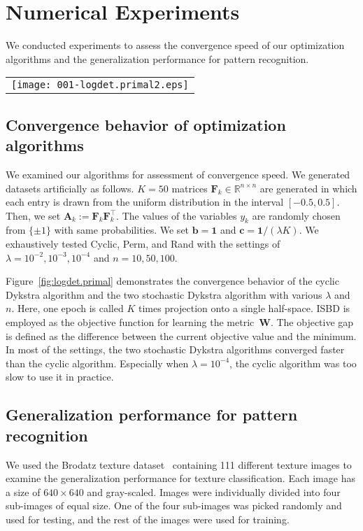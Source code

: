 \documentclass[10pt,onecolumn]{article}
\theoremstyle{definition}
\theoremstyle{definition}
\theoremstyle{definition}
\theoremstyle{definition}
\theoremstyle{definition}
\theoremstyle{theorem}
\newcommand{\0}{{\bm{0}}}
\newcommand{\1}{{\bm{1}}}
\newcommand{\vb}{{\bm{b}}}
\newcommand{\vc}{{\bm{c}}}
\newcommand{\vA}{{\bm{A}}}
\newcommand{\vF}{{\bm{F}}}
\newcommand{\bR}{{\mathbb{R}}}
\newcommand{\vW}{{\bm{W}}}
\begin{document}
\section{Numerical Experiments}

We conducted experiments to assess the convergence speed of
our optimization algorithms and the generalization
performance for pattern recognition.

\begin{figure*}[t!]
\begin{center}
\begin{tabular}{l}
\texttt{[image: 001-logdet.primal2.eps]}
\end{tabular}
\end{center}
\caption{Convergence behavior of the algorithms using different settings. \label{fig:logdet.primal}}
\end{figure*}

\subsection{Convergence behavior of optimization algorithms}
We examined our algorithms for assessment of convergence
speed. We generated datasets artificially as follows. $K=50$
matrices $\vF_{k}\in\bR^{n\times n}$ are generated in which
each entry is drawn from the uniform distribution in the
interval $[-0.5,0.5]$. Then, we set
$\vA_{k}:=\vF_{k}\vF_{k}^\top$. The values of the variables
$y_{k}$ are randomly chosen from $\{\pm 1\}$ with same
probabilities. We set $\vb=\1$ and $\vc=\1/(\lambda K)$. We
exhaustively tested Cyclic, Perm, and Rand with the settings
of $\lambda=10^{-2},10^{-3},10^{-4}$ and $n=10,50,100$.

Figure~\ref{fig:logdet.primal}
demonstrates the convergence behavior of the
cyclic Dykstra algorithm and the two stochastic Dykstra
algorithm with various $\lambda$ and $n$. Here, one epoch is
called $K$ times projection onto a single half-space.
ISBD is employed as the objective function for learning the metric~$\vW$.
The
objective gap is defined as the difference between the
current objective value and the minimum. In most of the
settings, the two stochastic Dykstra algorithms converged
faster than the cyclic algorithm. Especially when
$\lambda=10^{-4}$, the cyclic algorithm was too slow to use
it in practice.

\subsection{Generalization performance for pattern recognition}
We used the Brodatz texture dataset~\cite{randen1999filtering} containing 111
different texture images to examine the generalization
performance for texture classification. Each image has a size of
$640\times 640$ and gray-scaled. Images
were individually divided into four sub-images of equal size. One of
the four sub-images was picked randomly and used for
testing, and the rest of the images were used for training.
\end{document}
